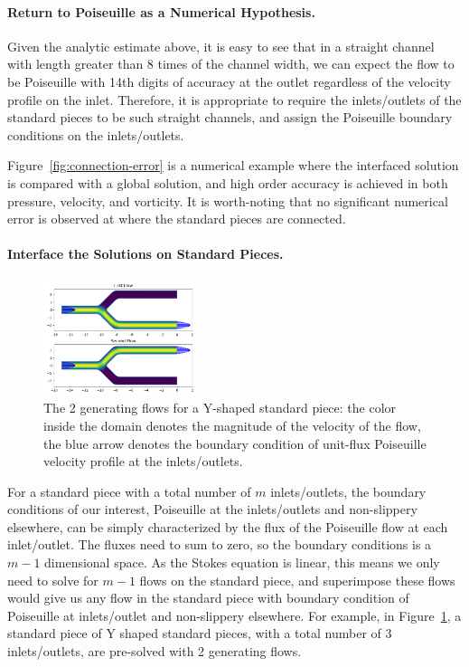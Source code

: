 \documentclass[10pt,twocolumn,letterpaper]{article}
\begin{document}
\paragraph{Return to Poiseuille as a Numerical Hypothesis.}
Given the analytic estimate above, it is easy to see that in a straight channel with
length greater than 8 times of the channel width, we can expect the flow to be
Poiseuille with 14th digits of accuracy at the outlet regardless of the
velocity profile on the inlet. Therefore, it is appropriate to require the
inlets/outlets of the standard pieces to be such straight channels, and assign
the Poiseuille boundary conditions on the inlets/outlets.

Figure~\ref{fig:connection-error} is a numerical example where the interfaced
solution is compared with a global solution, and high order accuracy is
achieved in both pressure, velocity, and vorticity. It is worth-noting that no
significant numerical error is observed at where the standard pieces are
connected.

\paragraph{Interface the Solutions on Standard Pieces.}

\begin{figure}[h!]
  \centering
  \includegraphics[width=0.4\textwidth]{pic/standard_pipe_flows_demo.png}
  \caption{The 2 generating flows for a Y-shaped standard piece: 
  the color inside the domain denotes the magnitude of the velocity of the flow, 
  the blue arrow denotes the boundary condition of unit-flux Poiseuille velocity profile at the inlets/outlets.}\label{fig:y_2_flows}
\end{figure}


For a standard piece with a total number of $m$ inlets/outlets, 
the boundary conditions of our interest, Poiseuille at the 
inlets/outlets and non-slippery elsewhere, can be simply
characterized by the flux of the Poiseuille flow at each inlet/outlet. The fluxes need 
to sum to zero, so the boundary conditions is a $m-1$ dimensional space. 
As the Stokes equation is linear, this means we only need to solve for 
$m-1$ flows on the standard piece, and superimpose these flows would give us 
any flow in the standard piece with boundary condition of Poiseuille at inlets/outlet 
and non-slippery elsewhere.
For example, in Figure~\ref{fig:y_2_flows}, a standard piece of Y shaped standard pieces, 
with a total number  of 3 inlets/outlets,
are pre-solved with 2 generating flows. 
\end{document}
